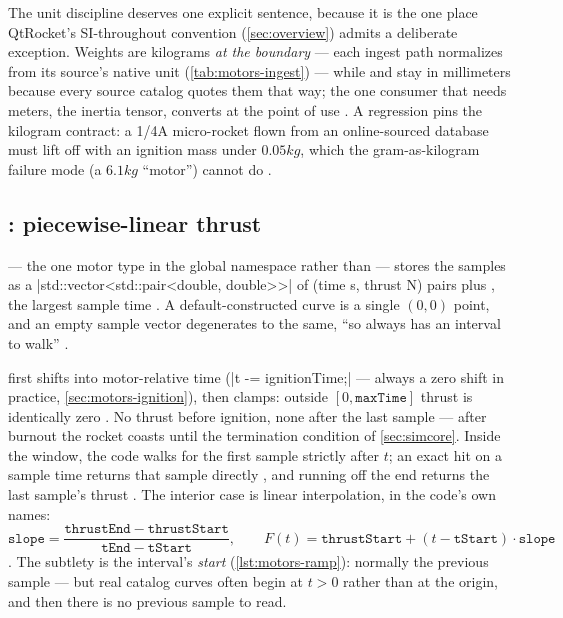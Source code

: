 The unit discipline deserves one explicit sentence, because it is the one place
QtRocket's SI-throughout convention (\cref{sec:overview}) admits a deliberate exception.
Weights are kilograms \emph{at the  boundary} --- each ingest path
normalizes from its source's native unit (\cref{tab:motors-ingest}) --- while
 and  stay in millimeters because every source catalog
quotes them that way; the one consumer that needs meters, the  inertia
tensor, converts at the point of use . A regression pins
the kilogram contract: a 1/4A micro-rocket flown from an online-sourced database must
lift off with an ignition mass under $0.05\unit{kg}$, which the gram-as-kilogram failure
mode (a $6.1\unit{kg}$ ``motor'') cannot do .

\subsection{: piecewise-linear thrust}\label{sec:motors-thrust}

  --- the one motor type in the global
namespace rather than  --- stores the samples as a
\cppinline|std::vector<std::pair<double, double>>| of (time s, thrust N) pairs
 plus , the largest sample time
. A default-constructed curve is a single $(0,0)$ point,
and an empty sample vector degenerates to the same, ``so  always has an
interval to walk'' .

  first shifts into motor-relative time
(\cppinline|t -= ignitionTime;|  --- always a zero shift
in practice, \cref{sec:motors-ignition}), then clamps: outside $[0,\mathtt{maxTime}]$
thrust is identically zero . No thrust before ignition,
none after the last sample --- after burnout the rocket coasts until the termination
condition of \cref{sec:simcore}. Inside the window, the code walks for the first sample
strictly after $t$; an exact hit on a sample time returns that sample directly
, and running off the end returns the last sample's
thrust . The interior case is linear interpolation, in
the code's own names:
\begin{equation}
\mathtt{slope} = \frac{\mathtt{thrustEnd}-\mathtt{thrustStart}}{\mathtt{tEnd}-\mathtt{tStart}},
\qquad
F(t) = \mathtt{thrustStart} + (t-\mathtt{tStart})\cdot\mathtt{slope}
\label{eq:motors-lerp}
\end{equation}
. The subtlety is the interval's \emph{start}
(\cref{lst:motors-ramp}): normally the previous sample --- but real catalog curves often
begin at $t>0$ rather than at the origin, and then there is no previous sample to read.

